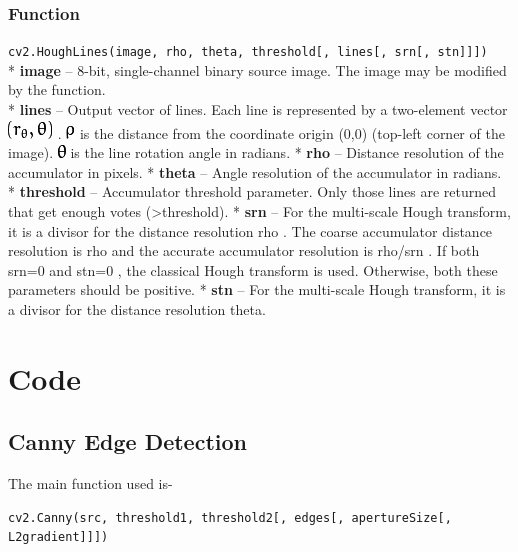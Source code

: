 \documentclass[]{article}
\begin{document}
\subsubsection{Function}\label{function}

\texttt{cv2.HoughLines(image,\ rho,\ theta,\ threshold{[},\ lines{[},\ srn{[},\ stn{]}{]}{]})}\\
* \textbf{image} -- 8-bit, single-channel binary source image. The image
may be modified by the function.\\
* \textbf{lines} -- Output vector of lines. Each line is represented by
a two-element vector
\includegraphics{images/Line_Detection/Hough Lines/r0.png} .
\includegraphics{images/Line_Detection/Hough Lines/rho.png} is the
distance from the coordinate origin (0,0) (top-left corner of the
image). \includegraphics{images/Line_Detection/Hough Lines/thetha.png}
is the line rotation angle in radians. * \textbf{rho} -- Distance
resolution of the accumulator in pixels. * \textbf{theta} -- Angle
resolution of the accumulator in radians. * \textbf{threshold} --
Accumulator threshold parameter. Only those lines are returned that get
enough votes (\textgreater{}threshold). * \textbf{srn} -- For the
multi-scale Hough transform, it is a divisor for the distance resolution
rho . The coarse accumulator distance resolution is rho and the accurate
accumulator resolution is rho/srn . If both srn=0 and stn=0 , the
classical Hough transform is used. Otherwise, both these parameters
should be positive. * \textbf{stn} -- For the multi-scale Hough
transform, it is a divisor for the distance resolution theta.

\section{Code}\label{code}

\subsection{Canny Edge Detection}\label{canny-edge-detection}

The main function used is-

\begin{verbatim}
cv2.Canny(src, threshold1, threshold2[, edges[, apertureSize[, L2gradient]]])
\end{verbatim}
\end{document}
